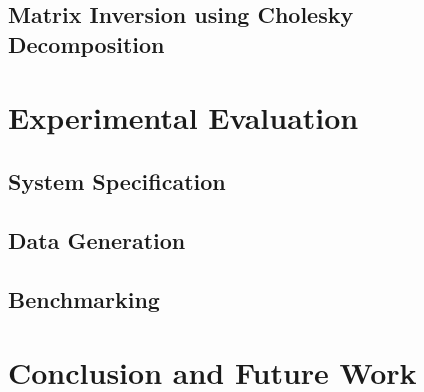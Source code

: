 \documentclass[11pt]{article}
\begin{document}
\subsection{Matrix Inversion using Cholesky Decomposition}

\section{Experimental Evaluation}
\subsection{System Specification}
\subsection{Data Generation}
\subsection{Benchmarking}

\section{Conclusion and Future Work}

\newpage



\end{document}
